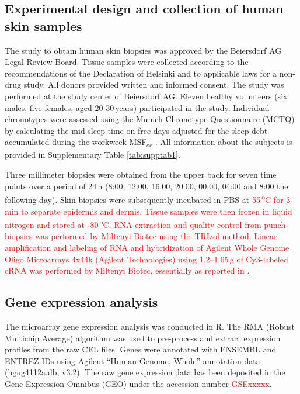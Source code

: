 \subsection*{Experimental design and collection of human skin samples}
The study to obtain human skin biopsies was approved by the Beiersdorf AG Legal Review Board. Tissue samples were collected according to the recommendations of the Declaration of Helsinki and to applicable laws for a non-drug study. All donors provided written and informed consent. The study was performed at the study center of Beiersdorf AG. Eleven healthy volunteers (six males, five females, aged 20-30\,years) participated in the study. Individual chronotypes were assessed using the Munich Chronotype Questionnaire (MCTQ) by calculating the mid sleep time on free days adjusted for the sleep-debt accumulated during the workweek MSF\textsubscript{sc} \cite{Vetter2021}. All information about the subjects is provided in Supplementary Table \ref{tab:supptab1}.  %

Three millimeter biopsies were obtained from the upper back for seven time points over a period of 24\,h (8:00, 12:00, 16:00, 20:00, 00:00, 04:00 and 8:00 the following day). Skin biopsies were subsequently incubated in PBS at \textcolor{red}{55\,\textsuperscript{o}C for 3\,min to separate epidermis and dermis. Tissue samples were then frozen in liquid nitrogen and stored at -80\,\textsuperscript{o}C. RNA extraction and quality control from punch-biopsies was performed by Miltenyi Biotec using the TRIzol method. Linear amplification and labeling of RNA and hybridization of Agilent Whole Genome Oligo Microarrays 4x44k (Agilent Technologies) using 1.2--1.65\,\textmu g of Cy3-labeled cRNA was performed by Miltenyi Biotec, essentially as reported in \cite{Duggan1999}.}  

\subsection*{Gene expression analysis}
The microarray gene expression analysis was conducted in R. The RMA (Robust Multichip Average) algorithm was used to pre-process and extract expression profiles from the raw CEL files. Genes were annotated with ENSEMBL and ENTREZ IDs using Agilent ``Human Genome, Whole'' annotation data (hgug4112a.db, v3.2). The raw gene expression data has been deposited in the Gene Expression Omnibus (GEO) under the accession number \textcolor{red}{GSExxxxx}. 

